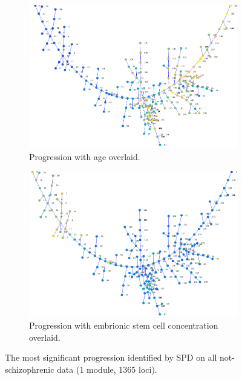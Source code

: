 \documentclass[]{article}
\begin{document}
  \begin{figure}[H]
    \centering
    \begin{subfigure}{.95\textwidth}
      \centering
      \includegraphics[width=1\linewidth]{control_youth_age.png}
      \caption{Progression with age overlaid.}
    \end{subfigure}
    \begin{subfigure}{.95\textwidth}
      \centering
      \includegraphics[width=1\linewidth]{control_youth_es.png}
      \caption{Progression with embrionic stem cell concentration overlaid.}
    \end{subfigure}
    \caption{The most significant progression identified by SPD on all not-schizophrenic data (1 module, 1365 loci).}
    \label{fig:spd1}
  \end{figure}
\end{document}
